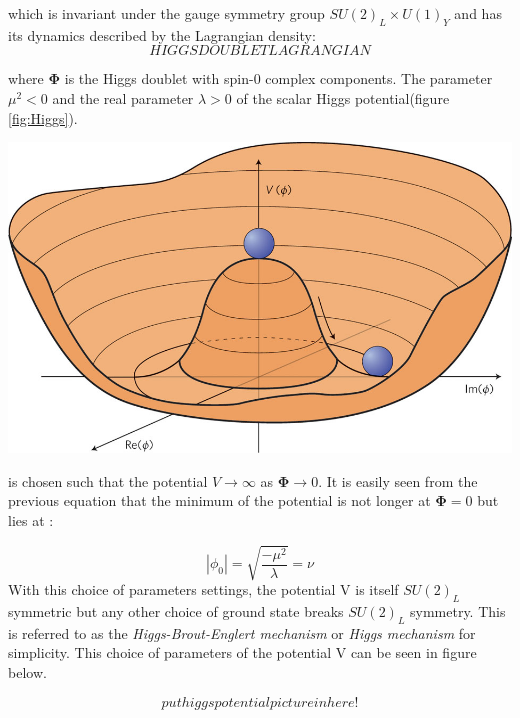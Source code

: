 which is invariant under the gauge symmetry group $SU(2)_{L} \times U(1)_{Y} $  and has its dynamics described by the Lagrangian density:
\begin{equation}
 HIGGS DOUBLET LAGRANGIAN
\end{equation}

where $\mathbf{\Phi}$ is the Higgs doublet with spin-0 complex components.
The parameter $\mu^{2} < 0 $ and the real parameter $\lambda > 0$ of the scalar Higgs potential(figure \ref{fig:Higgs}).

\begin{center}
\centering
\includegraphics[scale=0.3]{THESISPLOTS/Higgs_Potential.jpg}
\label{fig:Higgs}
\end{center}



is chosen such that the potential $V \rightarrow \infty $ as $\mathbf{\Phi} \rightarrow  0 $.
It is easily seen from the previous equation that the minimum of the potential is not longer at $\mathbf{\Phi} = 0 $ but  lies at :

\begin{equation}
|\phi_{0}| = \sqrt{\frac{-\mu^{2}}{\lambda}}  = \nu
\end{equation}
With this choice of parameters settings, the potential V is itself $SU(2)_{L}$ symmetric but any other choice of ground state breaks $SU(2)_{L}$ symmetry. This is referred to as the \textit{Higgs-Brout-Englert mechanism} or \textit{Higgs mechanism} for simplicity.
This choice of parameters of the potential V can be seen in figure below.

\begin{equation}
put higgs potential picture in here!
\end{equation}

